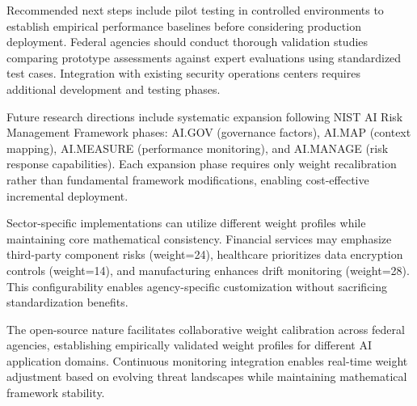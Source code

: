 \documentclass[11pt,letterpaper]{article}
\begin{document}
Recommended next steps include pilot testing in controlled environments to establish empirical performance baselines before considering production deployment. Federal agencies should conduct thorough validation studies comparing prototype assessments against expert evaluations using standardized test cases. Integration with existing security operations centers requires additional development and testing phases.

Future research directions include systematic expansion following NIST AI Risk Management Framework phases: AI.GOV (governance factors), AI.MAP (context mapping), AI.MEASURE (performance monitoring), and AI.MANAGE (risk response capabilities). Each expansion phase requires only weight recalibration rather than fundamental framework modifications, enabling cost-effective incremental deployment.

Sector-specific implementations can utilize different weight profiles while maintaining core mathematical consistency. Financial services may emphasize third-party component risks (weight=24), healthcare prioritizes data encryption controls (weight=14), and manufacturing enhances drift monitoring (weight=28). This configurability enables agency-specific customization without sacrificing standardization benefits.

The open-source nature facilitates collaborative weight calibration across federal agencies, establishing empirically validated weight profiles for different AI application domains. Continuous monitoring integration enables real-time weight adjustment based on evolving threat landscapes while maintaining mathematical framework stability.
\end{document}
